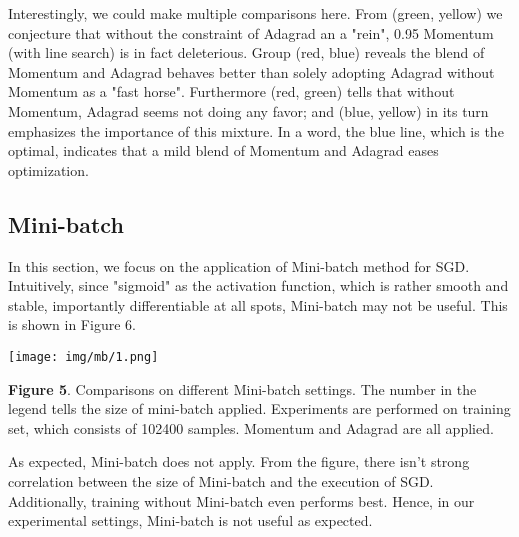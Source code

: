 \documentclass{article} %
\begin{document}
Interestingly, we could make multiple comparisons here. From (green, yellow) we conjecture that without the constraint of Adagrad an a "rein", 0.95 Momentum (with line search) is in fact deleterious. Group (red, blue) reveals the blend of Momentum and Adagrad behaves better than solely adopting Adagrad without Momentum as a "fast horse". Furthermore (red, green) tells that without Momentum, Adagrad seems not doing any favor; and (blue, yellow) in its turn emphasizes the importance of this mixture. In a word, the blue line, which is the optimal, indicates that a mild blend of Momentum and Adagrad eases optimization.

\subsection{Mini-batch}
In this section, we focus on the application of Mini-batch method for SGD. Intuitively, since "sigmoid" as the activation function, which is rather smooth and stable, importantly differentiable at all spots, Mini-batch may not be useful. This is shown in Figure 6.
\begin{center}
\texttt{[image: img/mb/1.png]} 
\end{center}
{\bf Figure 5}. Comparisons on different Mini-batch settings. The number in the legend tells the size of mini-batch applied. Experiments are performed on training set, which consists of 102400 samples. Momentum and Adagrad are all applied.

As expected, Mini-batch does not apply. From the figure, there isn't strong correlation between the size of Mini-batch and the execution of SGD. Additionally, training without Mini-batch even performs best. Hence, in our experimental settings, Mini-batch is not useful as expected.
\end{document}
